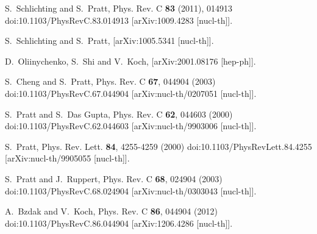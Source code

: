 \begin{thebibliography}{99}
S.~Schlichting and S.~Pratt,
Phys. Rev. C \textbf{83} (2011), 014913
doi:10.1103/PhysRevC.83.014913
[arXiv:1009.4283 [nucl-th]].

S.~Schlichting and S.~Pratt,
[arXiv:1005.5341 [nucl-th]].

D.~Oliinychenko, S.~Shi and V.~Koch,
[arXiv:2001.08176 [hep-ph]].

S.~Cheng and S.~Pratt,
Phys. Rev. C \textbf{67}, 044904 (2003)
doi:10.1103/PhysRevC.67.044904
[arXiv:nucl-th/0207051 [nucl-th]].
	
S.~Pratt and S.~Das Gupta,
Phys. Rev. C \textbf{62}, 044603 (2000)
doi:10.1103/PhysRevC.62.044603
[arXiv:nucl-th/9903006 [nucl-th]].

S.~Pratt,
Phys. Rev. Lett. \textbf{84}, 4255-4259 (2000)
doi:10.1103/PhysRevLett.84.4255
[arXiv:nucl-th/9905055 [nucl-th]].


S.~Pratt and J.~Ruppert,
Phys. Rev. C \textbf{68}, 024904 (2003)
doi:10.1103/PhysRevC.68.024904
[arXiv:nucl-th/0303043 [nucl-th]].


A.~Bzdak and V.~Koch,
Phys. Rev. C \textbf{86}, 044904 (2012)
doi:10.1103/PhysRevC.86.044904
[arXiv:1206.4286 [nucl-th]].


\end{thebibliography}

